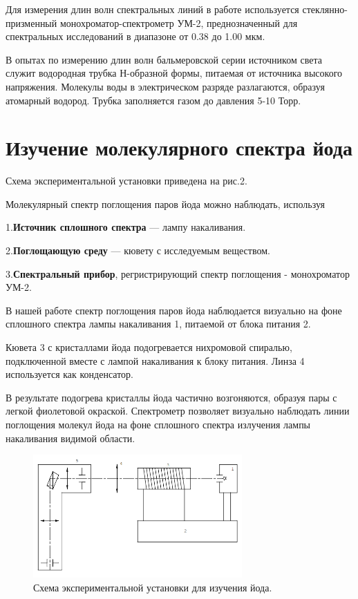 \documentclass[a4paper,12pt]{article}
\begin{document}
 
 Для измерения длин волн спектральных линий в работе используется стеклянно-призменный монохроматор-спектрометр УМ-2, преднозначенный для спектральных исследований в диапазоне от 0.38 до 1.00 мкм.
 
 В опытах по измерению длин волн бальмеровской серии источником света служит водородная трубка Н-образной формы, питаемая от источника высокого напряжения. Молекулы воды в электрическом разряде разлагаются, образуя атомарный водород. Трубка заполняется газом до давления 5-10 Торр.
 
 
 

\section{Изучение молекулярного спектра йода} 
  
  Схема экспериментальной установки приведена на рис.2.
  
    Молекулярный спектр поглощения паров йода можно наблюдать, используя
  
1.\textbf{Источник сплошного спектра} — лампу накаливания.

2.\textbf{Поглощающую среду} — кювету с исследуемым веществом.

3.\textbf{Спектральный прибор}, регристрирующий спектр поглощения - монохроматор УМ-2.

В нашей работе спектр поглощения паров йода наблюдается визуально на фоне сплошного спектра лампы накаливания 1, питаемой от блока питания 2.

Кювета 3 с кристаллами йода подогревается нихромовой спиралью, подключенной вместе с лампой накаливания к блоку питания. Линза 4 используется как конденсатор. 

В результате подогрева кристаллы йода частично возгоняются, образуя пары с легкой фиолетовой окраской. Спектрометр позволяет визуально наблюдать линии поглощения молекул йода на фоне сплошного спектра излучения лампы накаливания видимой области.

  
      \begin{figure}[H]
  \begin{center}
    \includegraphics[width=8cm]{ex2.png}
    \caption{Схема экспериментальной установки для изучения йода.}
    \label{fig:}
  \end{center}
\end{figure}
\end{document}
